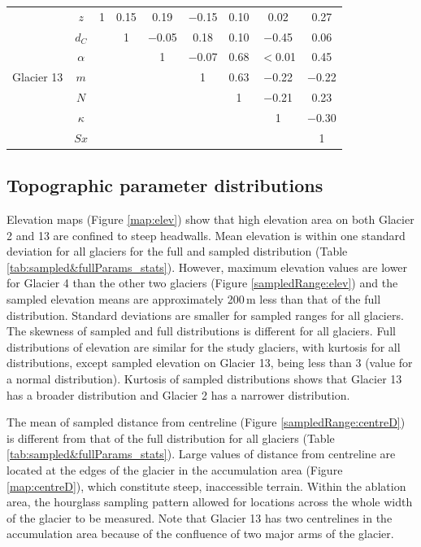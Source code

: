 \documentclass{sfuthesis}
\begin{document}
{\begin{table}[H]
\begin{tabular}{cc|ccccccc}
\multirow{7}{*}{Glacier 13} & $z$ & 1 & 0.15 & 0.19 & $-$0.15 & 0.10 & 0.02 & 0.27 \\
 & $d_C$ &   & 1 & $-$0.05 & 0.18 & 0.10 & $-$0.45 & 0.06 \\
 & $\alpha$ &   &   & 1 & $-$0.07 & 0.68 & $<$0.01 & 0.45 \\
 & $m$ &   &   &   & 1 & 0.63 & $-$0.22 & $-$0.22 \\
 & $N$ &   &   &   &   & 1 & $-$0.21 & 0.23 \\
 & $\kappa$ &   &   &   &   &   & 1 & $-$0.30 \\
 & $Sx$ &   &   &   &   &   &   & 1
\end{tabular}
\end{table}


\subsection{Topographic parameter distributions}


Elevation maps (Figure \ref{map:elev}) show that high elevation area on both Glacier 2 and 13 are confined to steep headwalls. Mean elevation is within one standard deviation for all glaciers for the full and sampled distribution (Table \ref{tab:sampled&fullParams_stats}). However, maximum elevation values are lower for Glacier 4 than the other two glaciers (Figure \ref{sampledRange:elev}) and the sampled elevation means are approximately 200\,m less than that of the full distribution. Standard deviations are smaller for sampled ranges for all glaciers. The skewness of sampled and full distributions is different for all glaciers. Full distributions of elevation are similar for the study glaciers, with kurtosis for all distributions, except sampled elevation on Glacier 13, being less than 3 (value for a normal distribution). Kurtosis of sampled distributions shows that Glacier 13 has a broader distribution and Glacier 2 has a narrower distribution. 

The mean of sampled distance from centreline (Figure \ref{sampledRange:centreD}) is different from that of the full distribution for all glaciers (Table \ref{tab:sampled&fullParams_stats}). Large values of distance from centreline are located at the edges of the glacier in the accumulation area (Figure \ref{map:centreD}), which constitute steep, inaccessible terrain. Within the ablation area, the hourglass sampling pattern allowed for locations across the whole width of the glacier to be measured. Note that Glacier 13 has two centrelines in the accumulation area because of the confluence of two major arms of the glacier.

}
\end{document}
